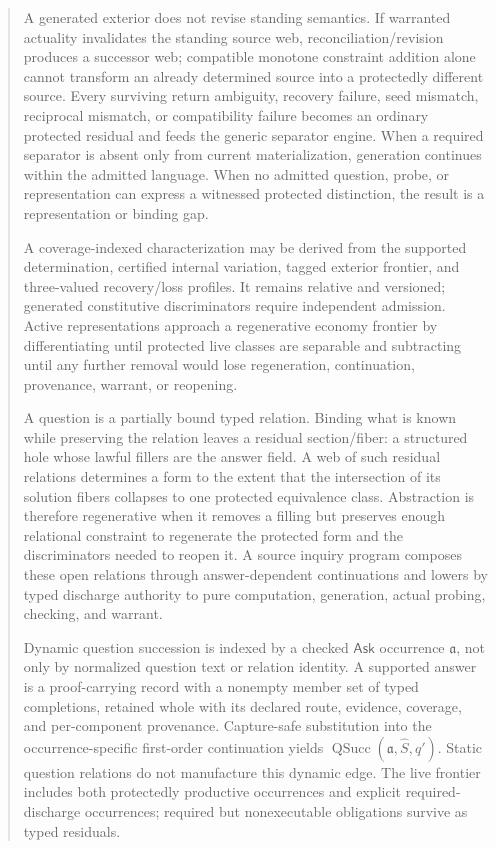 \documentclass[11pt,oneside]{article}
\newcommand{\QSucc}{\operatorname{QSucc}}
\newcommand{\AskRef}{\mathfrak a}
\begin{document}
\begin{quote}
A generated exterior does not revise standing semantics.  If warranted actuality invalidates the standing source web, reconciliation/revision produces a successor web; compatible monotone constraint addition alone cannot transform an already determined source into a protectedly different source.  Every surviving return ambiguity, recovery failure, seed mismatch, reciprocal mismatch, or compatibility failure becomes an ordinary protected residual and feeds the generic separator engine.  When a required separator is absent only from current materialization, generation continues within the admitted language.  When no admitted question, probe, or representation can express a witnessed protected distinction, the result is a representation or binding gap.

A coverage-indexed characterization may be derived from the supported determination,
certified internal variation, tagged exterior frontier, and three-valued recovery/loss
profiles.  It remains relative and versioned; generated constitutive discriminators
require independent admission.  Active representations approach a regenerative
economy frontier by differentiating until protected live classes are separable and
subtracting until any further removal would lose regeneration, continuation,
provenance, warrant, or reopening.

A question is a partially bound typed relation.  Binding what is known while preserving the relation leaves a residual section/fiber: a structured hole whose lawful fillers are the answer field.  A web of such residual relations determines a form to the extent that the intersection of its solution fibers collapses to one protected equivalence class.  Abstraction is therefore regenerative when it removes a filling but preserves enough relational constraint to regenerate the protected form and the discriminators needed to reopen it.  A source inquiry program composes these open relations through answer-dependent continuations and lowers by typed discharge authority to pure computation, generation, actual probing, checking, and warrant.

Dynamic question succession is indexed by a checked \(\mathsf{Ask}\) occurrence \(\AskRef\), not
only by normalized question text or relation identity.  A supported answer is a proof-carrying
record with a nonempty member set of typed completions, retained whole with its declared route,
evidence, coverage, and per-component
provenance.  Capture-safe substitution into the occurrence-specific first-order continuation yields
\(\QSucc(\AskRef,\widehat S,q')\).  Static question relations do not manufacture this dynamic edge.  The
live frontier includes both protectedly productive occurrences and explicit required-discharge
occurrences; required but nonexecutable obligations survive as typed residuals.


\end{quote}
\end{document}
